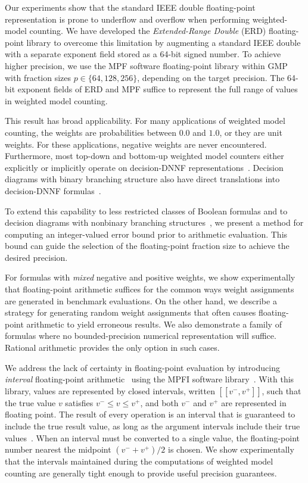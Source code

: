 \documentclass{easychair}
\newcommand{\vmin}{v^{-}}
\newcommand{\vmax}{v^{+}}
\newcommand{\interval}[1]{[\![#1]\!]}
\begin{document}
Our experiments show that the standard IEEE double floating-point
representation is prone to underflow and overflow when performing
weighted-model counting.  We have developed the \emph{Extended-Range
Double} (ERD) floating-point library to overcome this limitation by
augmenting a standard IEEE double with a separate exponent field
stored as a 64-bit signed number.  To achieve higher precision, we use
the MPF software floating-point library within GMP with fraction sizes
$p \in \{64, 128, 256\}$, depending on the target precision.
The 64-bit exponent fields of ERD and MPF suffice to represent
the full range of values in weighted model counting.

This result has broad applicability.
For many applications
of weighted model counting, the weights are probabilities between
$0.0$ and $1.0$, or they are unit weights.  For these applications,  negative weights are never encountered.
Furthermore, most top-down and bottom-up weighted model
counters either explicitly or implicitly operate on decision-DNNF
representations~\cite{beame:uai:2013}.  
Decision diagrams with binary branching structure
also have direct translations into decision-DNNF formulas~\cite{huang:jair:2007,oztok:cp:2014}.

To extend this capability to less restricted classes of Boolean
formulas and to decision diagrams with nonbinary branching
structures~\cite{darwiche:ijcai:2011,srinivasan:iccad:1990}, we
present a method for computing an integer-valued error bound prior to arithmetic
evaluation.  This bound can guide the selection of the floating-point fraction size to
achieve the desired precision.

For formulas with \emph{mixed} negative and positive weights,
we show experimentally that floating-point
arithmetic suffices for the common ways weight assignments are generated in benchmark evaluations.
On the other hand, we
describe a strategy for generating random weight assignments that
often causes floating-point arithmetic to yield erroneous results.
We also
demonstrate a family of
formulas where no bounded-precision numerical representation will
suffice.  Rational arithmetic provides the only option in such cases.

We address the lack of certainty in floating-point
evaluation by introducing \emph{interval} floating-point
arithmetic~\cite{hickey:jacm:2001} using the MPFI software
library~\cite{revol:rc:2005}. With this library, values are
represented by closed intervals, written $\interval{\vmin, \vmax}$, such that the
true value $v$ satisfies $\vmin \leq v \leq \vmax$, and both $\vmin$ and $\vmax$ are
represented in floating point.  The result of every operation is an
interval that is guaranteed to include the true result value, as long
as the argument intervals include their true values~\cite{hickey:jacm:2001,muller:hfpa:2018}.
When an interval must be converted to a single value, the floating-point number nearest the midpoint $(\vmin+\vmax)/2$ is chosen.
We show
experimentally that the intervals maintained during the computations
of weighted model counting are generally tight enough to provide
useful precision guarantees.
\end{document}

